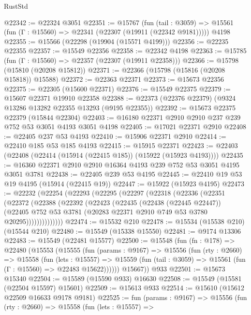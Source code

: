 \begin{lexlean}{RustStd}
\begin{coremodule}
@22342 := @22324 @3051
@22351 := @15767
    (fun (tail : @3059) => @15561 (fun (Γ : @15560) => @22341 (@22307 (@19911 (@22342 @9181)))))
    @4198
@22355 := @15566 (@22298 (@19904 (@15571 @4199)))
@22356 := @22235 @22355
@22357 := @15549 @22356
@22358 := @22342 @4198
@22363 := @15785 (fun (Γ : @15560) => @22357 (@22307 (@19911 @22358)))
@22366 := @15798 (@15810 (@20208 @15812))
@22371 := @22366 (@15798 (@15816 (@20208 @15818)) @15588)
@22372 := @22363 @22371
@22373 := @15673 @22356
@22375 := @22305 (@15600 @22371)
@22376 := @15549 @22375
@22379 := @15607 @22371 @19910 @22358
@22388 := @22373 (@22376 @22379) (@9324 @13286 @13282 @22355 @13293 (@9195 @22355))
@22392 := @15673 @22375 @22379 (@15844 @22304)
@22403 := @16180 @22371 @2910 @2910 @237 @239 @752 @53 @3051 @4193 @3051 @4198
@22405 := @17021 @22371 @2910
@22408 := @22405 @237 @53 @4193
@22410 := @15906 @22371 @2910
@22414 := @22410 @185 @53 @185 @4193
@22415 := @15915 @22371
@22423 := @22403 (@22408 (@22414 (@15914 (@22415 @185)) (@15922 (@15923 @4193))))
@22435 := @16360 @22371 @2910 @2910 @16364 @4193 @239 @752 @53 @3051 @4195 @3051 @3781
@22438 := @22405 @239 @53 @4195
@22445 := @22410 @19 @53 @19 @4195 (@15914 (@22415 @19))
@22447 := @15922 (@15923 @4195)
@22473 := @22232
    (@22254
      (@22293
        (@22295
          (@22297
            (@22318
              (@22336
                (@22351
                  (@22372
                    (@22388
                      (@22392
                        (@22423
                          (@22435
                            (@22438 (@22445 @22447))
                            (@22405
                              @752
                              @53
                              @3781
                              (@20283 @22371 @2910 @749 @53 @3780 @20295))))))))))))))
@22474 := @15532 @210
@22478 := @15534 (@15538 @210) (@15544 @210)
@22480 := @15549 (@15338 @15550)
@22481 := @9174 @13306
@22483 := @15549 (@22481 @15577)
@22500 := @15548
    (fun (fn : @178) =>
    @22480
      (@15553
        (@15555
          (fun (params : @9167) =>
          @15556
            (fun (rty : @2660) =>
            @15558
              (fun (lets : @15557) =>
              @15559 (fun (tail : @3059) => @15561 (fun (Γ : @15560) => @22483 @15622))))))
        @15667))
    @933
@22501 := @15673 @15340
@22504 := @15589 (@15590 @933) @16630
@22508 := @15549 (@15581 (@22504 @15597) @15601)
@22509 := @15613 @933
@22514 := @15610 (@15612 @22509 @16633 @9178 @9181)
@22525 := fun (params : @9167) =>
  @15556
    (fun (rty : @2660) =>
    @15558
      (fun (lets : @15557) =>

\end{coremodule}
\end{lexlean}
